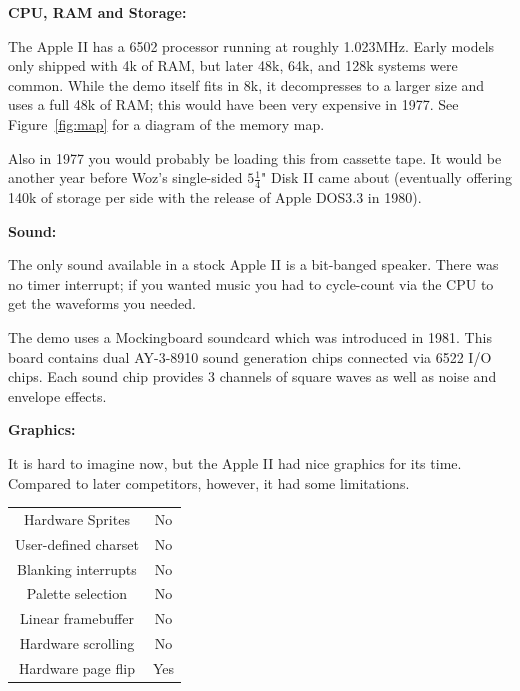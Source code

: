 \documentclass[twocolumn]{article}
\begin{document}
\vspace{1ex}
\noindent
{\bf CPU, RAM and Storage:}

The Apple II has a 6502 processor running at roughly 1.023MHz.
Early models only shipped with 4k of RAM, but later 48k, 64k, and 128k
systems were common.
While the demo itself fits in 8k, it decompresses to a larger size and uses
a full 48k of RAM;
this would have been very expensive in 1977.
See Figure~\ref{fig:map} for a diagram of the memory map.

Also in 1977 you would probably be loading this from cassette tape.
It would be another year before Woz's single-sided
$5\frac{1}{4}$" Disk II came about (eventually offering 140k of
storage per side with the release of Apple DOS3.3 in 1980). 
	
\vspace{1ex}
\noindent
{\bf Sound:}

The only sound available in a stock Apple II is a bit-banged speaker.
There was no timer interrupt; if you wanted music you had to cycle-count
via the CPU to get the waveforms you needed.

The demo uses a Mockingboard soundcard which was introduced in 1981.
This board contains dual AY-3-8910 sound generation chips connected via
6522 I/O chips.
Each sound chip provides 3 channels of square waves as well as noise and
envelope effects.

\vspace{1ex}
\noindent
{\bf Graphics:}

It is hard to imagine now, but the Apple II had nice graphics for its time.
Compared to later competitors, however, it had some limitations.

\begin{center}
\begin{tabular}{|c|c|}
\hline
Hardware Sprites     &	No \\
User-defined charset &	No \\
Blanking interrupts  &	No \\
Palette selection    &	No \\
Linear framebuffer   &	No \\
Hardware scrolling   &	No \\
Hardware page flip   &	Yes \\
\hline
\end{tabular}
\end{center}
\end{document}
